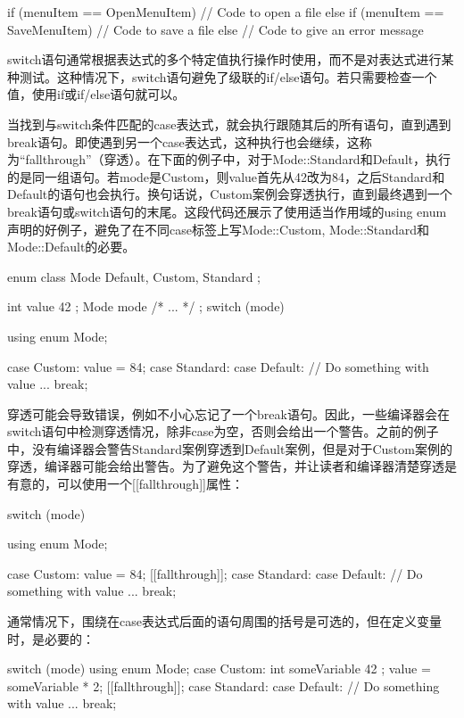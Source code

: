 \begin{cpp}
if (menuItem == OpenMenuItem) {
    // Code to open a file
} else if (menuItem == SaveMenuItem) {
    // Code to save a file
} else {
    // Code to give an error message
}
\end{cpp}

switch语句通常根据表达式的多个特定值执行操作时使用，而不是对表达式进行某种测试。这种情况下，switch语句避免了级联的if/else语句。若只需要检查一个值，使用if或if/else语句就可以。

当找到与switch条件匹配的case表达式，就会执行跟随其后的所有语句，直到遇到break语句。即使遇到另一个case表达式，这种执行也会继续，这称为“fallthrough”（穿透）。在下面的例子中，对于Mode::Standard和Default，执行的是同一组语句。若mode是Custom，则value首先从42改为84，之后Standard和Default的语句也会执行。换句话说，Custom案例会穿透执行，直到最终遇到一个break语句或switch语句的末尾。这段代码还展示了使用适当作用域的using enum声明的好例子，避免了在不同case标签上写Mode::Custom, Mode::Standard和Mode::Default的必要。

\begin{cpp}
enum class Mode { Default, Custom, Standard };

int value { 42 };
Mode mode { /* ... */ };
switch (mode) {
    using enum Mode;

    case Custom:
        value = 84;
    case Standard:
    case Default:
        // Do something with value ...
        break;
}
\end{cpp}

穿透可能会导致错误，例如不小心忘记了一个break语句。因此，一些编译器会在switch语句中检测穿透情况，除非case为空，否则会给出一个警告。之前的例子中，没有编译器会警告Standard案例穿透到Default案例，但是对于Custom案例的穿透，编译器可能会给出警告。为了避免这个警告，并让读者和编译器清楚穿透是有意的，可以使用一个[[fallthrough]]属性：

\begin{cpp}
switch (mode) {
    using enum Mode;

    case Custom:
        value = 84;
        [[fallthrough]];
    case Standard:
    case Default:
        // Do something with value ...
        break;
}
\end{cpp}

通常情况下，围绕在case表达式后面的语句周围的括号是可选的，但在定义变量时，是必要的：

\begin{cpp}
switch (mode) {
    using enum Mode;
    case Custom:
        {
            int someVariable { 42 };
            value = someVariable * 2;
            [[fallthrough]];
        }
    case Standard:
    case Default:
        // Do something with value ...
        break;
}
\end{cpp}

